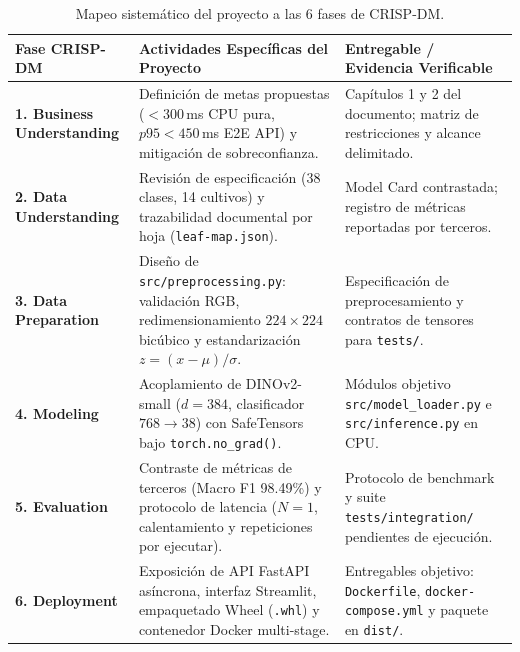 \documentclass[12pt,letterpaper]{article}
\begin{document}
\begin{table}[!htbp]
\centering
\caption{Mapeo sistemático del proyecto a las 6 fases de CRISP-DM.}
\label{tab:crisp_dm}
\footnotesize
\begin{tabularx}{\textwidth}{p{2.8cm} X p{5.4cm}}
\toprule
\textbf{Fase CRISP-DM} & \textbf{Actividades Específicas del Proyecto} & \textbf{Entregable / Evidencia Verificable} \\
\midrule
\textbf{1. Business Understanding} & Definición de metas propuestas ($< 300$\,ms CPU pura, $p95 < 450$\,ms E2E API) y mitigación de sobreconfianza. & Capítulos 1 y 2 del documento; matriz de restricciones y alcance delimitado. \\
\textbf{2. Data Understanding} & Revisión de especificación (38 clases, 14 cultivos) y trazabilidad documental por hoja (\texttt{leaf-map.json}). & Model Card contrastada; registro de métricas reportadas por terceros. \\
\textbf{3. Data Preparation} & Diseño de \texttt{src/\allowbreak preprocessing.py}: validación RGB, redimensionamiento $224 \times 224$ bicúbico y estandarización $z = (x - \mu)/\sigma$. & Especificación de preprocesamiento y contratos de tensores para \texttt{tests/}. \\
\textbf{4. Modeling} & Acoplamiento de DINOv2-small ($d=384$, clasificador $768 \rightarrow 38$) con SafeTensors bajo \texttt{torch.\allowbreak no\_grad()}. & Módulos objetivo \texttt{src/\allowbreak model\_loader.py} e \texttt{src/\allowbreak inference.py} en CPU. \\
\textbf{5. Evaluation} & Contraste de métricas de terceros (Macro F1 98.49\%) y protocolo de latencia ($N=1$, calentamiento y repeticiones por ejecutar). & Protocolo de benchmark y suite \texttt{tests/\allowbreak integration/} pendientes de ejecución. \\
\textbf{6. Deployment} & Exposición de API FastAPI asíncrona, interfaz Streamlit, empaquetado Wheel (\texttt{.whl}) y contenedor Docker multi-stage. & Entregables objetivo: \texttt{Dockerfile}, \texttt{docker-compose.yml} y paquete en \texttt{dist/}. \\
\bottomrule
\end{tabularx}
\end{table}
\end{document}
